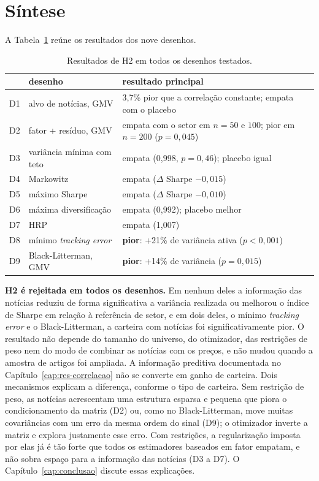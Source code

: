 \section{Síntese}
\label{sec:sintese-h2}

A Tabela~\ref{tab:sintese-h2} reúne os resultados dos nove desenhos.

\begin{table}[htbp]
\centering
\small
\caption{Resultados de H2 em todos os desenhos testados.}
\label{tab:sintese-h2}
\begin{tabularx}{\textwidth}{>{\raggedright\arraybackslash}p{0.9cm}>{\raggedright\arraybackslash}p{4.6cm}X}
\toprule
& desenho & resultado principal \\
\midrule
D1 & alvo de notícias, GMV & 3,7\% pior que a correlação constante; empata com o placebo \\
D2 & fator + resíduo, GMV & empata com o setor em $n=50$ e $100$; pior em $n=200$ ($p=0{,}045$) \\
D3 & variância mínima com teto & empata (0,998, $p=0{,}46$); placebo igual \\
D4 & Markowitz & empata ($\Delta$ Sharpe $-0{,}015$) \\
D5 & máximo Sharpe & empata ($\Delta$ Sharpe $-0{,}010$) \\
D6 & máxima diversificação & empata (0,992); placebo melhor \\
D7 & HRP & empata (1,007) \\
D8 & mínimo \emph{tracking error} & \textbf{pior}: +21\% de variância ativa ($p<0{,}001$) \\
D9 & Black-Litterman, GMV & \textbf{pior}: +14\% de variância ($p=0{,}015$) \\
\bottomrule
\end{tabularx}
\end{table}

\textbf{H2 é rejeitada em todos os desenhos.} Em nenhum deles a informação das notícias reduziu de forma
significativa a variância realizada ou melhorou o índice de Sharpe em relação à referência de setor, e em
dois deles, o mínimo \emph{tracking error} e o Black-Litterman, a carteira com notícias foi
significativamente pior. O resultado não depende do tamanho do universo, do otimizador, das restrições de
peso nem do modo de combinar as notícias com os preços, e não mudou quando a amostra de artigos foi
ampliada. A informação preditiva documentada no Capítulo~\ref{cap:res-correlacao} não se converte em ganho
de carteira. Dois mecanismos explicam a diferença, conforme o tipo de carteira. Sem restrição de peso, as
notícias acrescentam uma estrutura esparsa e pequena que piora o condicionamento da matriz (D2) ou, como
no Black-Litterman, move muitas covariâncias com um erro da mesma ordem do sinal (D9); o otimizador
inverte a matriz e explora justamente esse erro. Com restrições, a regularização imposta por elas já é
tão forte que todos os estimadores baseados em fator empatam, e não sobra espaço para a informação das
notícias (D3 a D7). O Capítulo~\ref{cap:conclusao} discute essas explicações.

\clearpage
